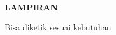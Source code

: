 \newpage %
\singlespacing
\begin{center}
\begin{large}\textbf{LAMPIRAN}\\\end{large}
\end{center}
\vspace{5mm}
Bisa diketik sesuai kebutuhan